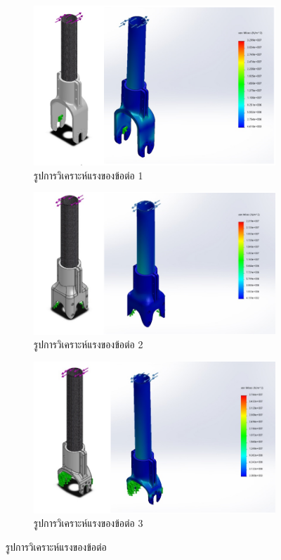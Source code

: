 \begin{figure}[!ht]
  \centering
  \begin{subfigure}[b]{0.32\linewidth}
    \includegraphics[width=\linewidth]{chapter4/images/FEA1.PNG}
    \caption{รูปการวิเคราะห์แรงของข้อต่อ 1}
  \end{subfigure}
  \begin{subfigure}[b]{0.32\linewidth}
    \includegraphics[width=\linewidth]{chapter4/images/FEA2.PNG}
    \caption{รูปการวิเคราะห์แรงของข้อต่อ 2}
  \end{subfigure}
  \begin{subfigure}[b]{0.32\linewidth}
      \includegraphics[width=\linewidth]{chapter4/images/FEA3.PNG}
      \caption{รูปการวิเคราะห์แรงของข้อต่อ 3}
  \end{subfigure}
  \caption{รูปการวิเคราะห์แรงของข้อต่อ}
\end{figure}

